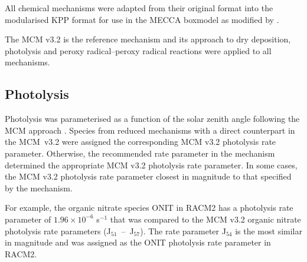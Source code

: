 All chemical mechanisms were adapted from their original format into the modularised KPP \citep{Damian:2002} format for use in the MECCA boxmodel \citep{Sander:2005} as modified by \citep{Butler:2011}.

The MCM v3.2 \citep{Jenkin:1997, Jenkin:2003, Saunders:2003, Bloss:2005, MCM_Site} is the reference mechanism and its approach to dry deposition, photolysis and peroxy radical--peroxy radical reactions were applied to all mechanisms. 

\subsection{Photolysis} \label{ss:photolysis}
Photolysis was parameterised as a function of the solar zenith angle following the MCM approach \citep{Saunders:2003}.
Species from reduced mechanisms with a direct counterpart in the \mbox{MCM v3.2} were assigned the corresponding MCM v3.2 photolysis rate parameter. 
Otherwise, the recommended rate parameter in the mechanism determined the appropriate MCM v3.2 photolysis rate parameter. 
In some cases, the MCM v3.2 photolysis rate parameter closest in magnitude to that specified by the mechanism. 

For example, the organic nitrate species ONIT in RACM2 has a photolysis rate parameter of $1.96 \times 10^{-6}$ s$^{-1}$ that was compared to the MCM v3.2 organic nitrate photolysis rate parameters \mbox{(J$_{51}$ -- J$_{57}$)}. 
The rate parameter J$_{54}$ is the most similar in magnitude and was assigned as the ONIT photolysis rate parameter in RACM2.

